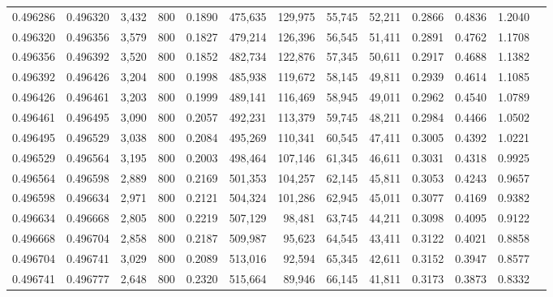 \begin{tabular}{rrrrrrrrrrrrr}
0.496286 & 0.496320 &  3,432 & 800 &                                     0.1890 & 475,635 & 129,975 &  55,745 &  52,211 & 0.2866 & 0.4836 & 1.2040 \\
0.496320 & 0.496356 &  3,579 & 800 &                                     0.1827 & 479,214 & 126,396 &  56,545 &  51,411 & 0.2891 & 0.4762 & 1.1708 \\
0.496356 & 0.496392 &  3,520 & 800 &                                     0.1852 & 482,734 & 122,876 &  57,345 &  50,611 & 0.2917 & 0.4688 & 1.1382 \\
0.496392 & 0.496426 &  3,204 & 800 &                                     0.1998 & 485,938 & 119,672 &  58,145 &  49,811 & 0.2939 & 0.4614 & 1.1085 \\
0.496426 & 0.496461 &  3,203 & 800 &                                     0.1999 & 489,141 & 116,469 &  58,945 &  49,011 & 0.2962 & 0.4540 & 1.0789 \\
0.496461 & 0.496495 &  3,090 & 800 &                                     0.2057 & 492,231 & 113,379 &  59,745 &  48,211 & 0.2984 & 0.4466 & 1.0502 \\
0.496495 & 0.496529 &  3,038 & 800 &                                     0.2084 & 495,269 & 110,341 &  60,545 &  47,411 & 0.3005 & 0.4392 & 1.0221 \\
0.496529 & 0.496564 &  3,195 & 800 &                                     0.2003 & 498,464 & 107,146 &  61,345 &  46,611 & 0.3031 & 0.4318 & 0.9925 \\
0.496564 & 0.496598 &  2,889 & 800 &                                     0.2169 & 501,353 & 104,257 &  62,145 &  45,811 & 0.3053 & 0.4243 & 0.9657 \\
0.496598 & 0.496634 &  2,971 & 800 &                                     0.2121 & 504,324 & 101,286 &  62,945 &  45,011 & 0.3077 & 0.4169 & 0.9382 \\
0.496634 & 0.496668 &  2,805 & 800 &                                     0.2219 & 507,129 &  98,481 &  63,745 &  44,211 & 0.3098 & 0.4095 & 0.9122 \\
0.496668 & 0.496704 &  2,858 & 800 &                                     0.2187 & 509,987 &  95,623 &  64,545 &  43,411 & 0.3122 & 0.4021 & 0.8858 \\
0.496704 & 0.496741 &  3,029 & 800 &                                     0.2089 & 513,016 &  92,594 &  65,345 &  42,611 & 0.3152 & 0.3947 & 0.8577 \\
0.496741 & 0.496777 &  2,648 & 800 &                                     0.2320 & 515,664 &  89,946 &  66,145 &  41,811 & 0.3173 & 0.3873 & 0.8332 \\

\end{tabular}
